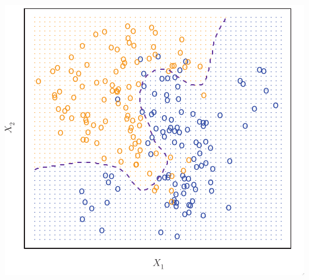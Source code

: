 \documentclass[leqno, 10pt, envcountsect]{beamer}
\numberwithin{equation}{section}
\theoremstyle{definition}
\theoremstyle{example}
\numberwithin{figure}{section}
\numberwithin{table}{section}
\begin{document}
\begin{frame}[fragile=singleslide]
\begin{center}
  \includegraphics[scale=0.15]{frontier}
\end{center}
\end{frame}
\end{document}
